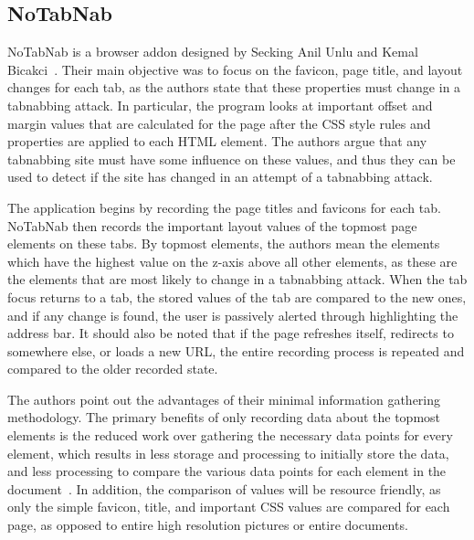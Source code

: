\documentclass[12pt]{article}
\begin{document}
\begin{doublespace}
\subsection{NoTabNab}
\begin{comment}
Another extension, NoTabNab created by Seckin Anil Unlu and Kemal Bicakci~\cite{NoTabNab}, notifies the user when the favicon or the tab name change as well as when a new layer is added to an inactive tab. 
\end{comment}

NoTabNab is a browser addon designed by Secking Anil Unlu and Kemal Bicakci~\cite{NoTabNab}.  Their main objective was to focus on the favicon, page title, and layout changes for each tab, as the authors state that these properties must change in a tabnabbing attack.  In particular, the program looks at important offset and margin values that are calculated for the page after the CSS style rules and properties are applied to each HTML element.  The authors argue that any tabnabbing site must have some influence on these values, and thus they can be used to detect if the site has changed in an attempt of a tabnabbing attack.

The application begins by recording the page titles and favicons for each tab.  NoTabNab then records the important layout values of the topmost page elements on these tabs.  By topmost elements, the authors mean the elements which have the highest value on the z-axis above all other elements, as these are the elements that are most likely to change in a tabnabbing attack.  When the tab focus returns to a tab, the stored values of the tab are compared to the new ones, and if any change is found, the user is passively alerted through highlighting the address bar.  It should also be noted that if the page refreshes itself, redirects to somewhere else, or loads a new URL, the entire recording process is repeated and compared to the older recorded state. 

The authors point out the advantages of their minimal information gathering methodology.  The primary benefits of only recording data about the topmost elements is the reduced work over gathering the necessary data points for every element, which results in less storage and processing to initially store the data, and less processing to compare the various data points for each element in the document~\cite{NoTabNab}.  In addition, the comparison of values will be resource friendly, as only the simple favicon, title, and important CSS values are compared for each page, as opposed to entire high resolution pictures or entire documents.  


\end{doublespace}
\end{document}
